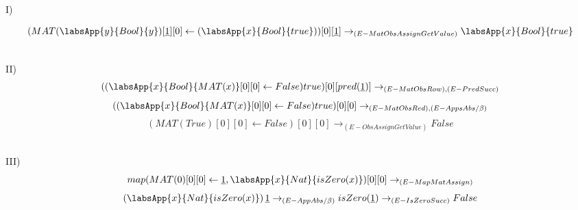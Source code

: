 \documentclass[leqno, 12pt, twoside, letterpaper]{book}
\begin{document}
\begin{center}
\end{center}

\begin{center}
\end{center}

\begin{center}
\end{center}




 I) 

$$
 (MAT(\labsApp{y}{Bool}{y})[\underline{1}][0] \leftarrow (\labsApp{x}{Bool}{true}))[0][\underline{1}] \rightarrow_{(E - MatObsAssignGetValue)} 
  \labsApp{x}{Bool}{true} 
$$

\hfill\\

\noindent II) $$ ((\labsApp{x}{Bool}{MAT(x)}[0][0] \leftarrow False) true)[0][pred(\underline{1})] \rightarrow_{(E - MatObsRow), (E - PredSucc)}$$
$$ ((\labsApp{x}{Bool}{MAT(x)}[0][0] \leftarrow False) true)[0][0] \rightarrow_{ (E - MatObsRed), (E - AppsAbs / \beta)} $$
$$ (MAT(True)[0][0] \leftarrow False)[0][0] \rightarrow_{ (E - ObsAssignGetValue)} False $$

\hfill\\

\noindent III) $$ map(MAT(0)[0][0] \leftarrow \underline{1}, \labsApp{x}{Nat}{isZero(x)})[0][0] \rightarrow_{(E - MapMatAssign)}$$
$$ (\labsApp{x}{Nat}{isZero(x)}) \, \underline{1} \rightarrow_{(E - AppAbs / \beta)} isZero(\underline{1}) \rightarrow_{(E - IsZeroSucc)} False $$
\end{document}
